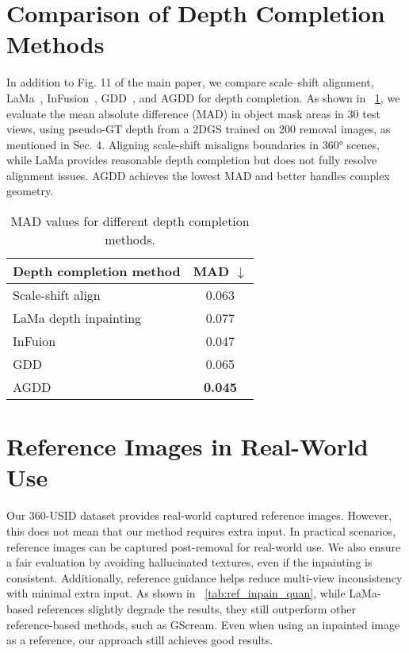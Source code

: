 

\section{Comparison of Depth Completion Methods}
\label{sec:mad}
In addition to Fig. \textcolor{cvprblue}{11} of the main paper, we compare scale–shift alignment, LaMa~\cite{lama}, InFusion~\cite{liu2024infusion}, GDD~\cite{yu2024wonderworld}, and AGDD for depth completion. As shown in ~\cref{tab:mad_quan}, we evaluate the mean absolute difference (MAD) in object mask areas in 30 test views, using pseudo-GT depth from a 2DGS trained on 200 removal images, as mentioned in Sec. \textcolor{cvprblue}{4}.
Aligning scale-shift misaligns boundaries in 360° scenes, while LaMa provides reasonable depth completion but does not fully resolve alignment issues. AGDD achieves the lowest MAD and better handles complex geometry.


\begin{table}[h]
\centering
\tiny
\caption{MAD values for different depth completion methods.} %
\label{tab:mad_quan}  %
\resizebox{\columnwidth}{!} {
\begin{tabular}{p{4cm}|c} %
\toprule
Depth completion method & MAD $\downarrow$ \\
\midrule
Scale-shift align & 0.063 \\
LaMa depth inpainting & 0.077 \\ 
InFuion & 0.047 \\
GDD & 0.065\\ 
AGDD & \textbf{0.045} \\
\bottomrule
\end{tabular}
}
\vspace{-1.3pc}
\end{table}

\section{Reference Images in Real-World Use}
\label{sec:ref_require}
Our 360-USID dataset provides real-world captured reference images. However, this does not mean that our method requires extra input. In practical scenarios, reference images can be captured post-removal for real-world use. We also ensure a fair evaluation by avoiding hallucinated textures, even if the inpainting is consistent. Additionally, reference guidance helps reduce multi-view inconsistency with minimal extra input.
As shown in ~\cref{tab:ref_inpain_quan}, while LaMa-based references slightly degrade the results, they still outperform other reference-based methods, such as GScream. Even when using an inpainted image as a reference, our approach still achieves good results.

